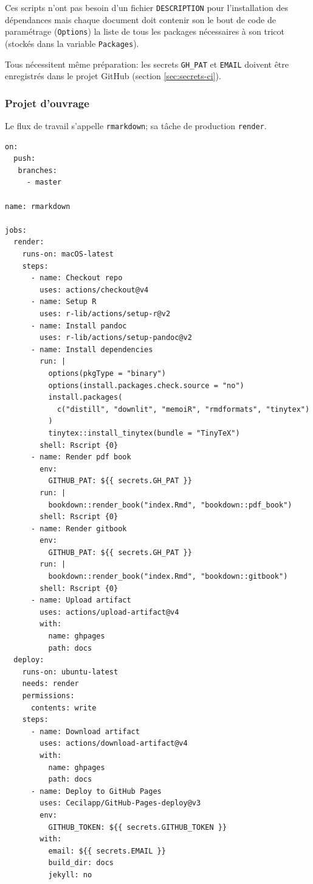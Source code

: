 \documentclass[
  12pt,
  french,
  a4paper,
  extrafontsizes,onecolumn,openright
  ]{memoir}
\begin{document}
Ces scripts n'ont pas besoin d'un fichier \texttt{DESCRIPTION} pour l'installation des dépendances mais chaque document doit contenir son le bout de code de paramétrage (\texttt{Options}) la liste de tous les packages nécessaires à son tricot (stockés dans la variable \texttt{Packages}).

Tous nécessitent même préparation: les secrets \texttt{GH\_PAT} et \texttt{EMAIL} doivent être enregistrés dans le projet GitHub (section \ref{sec:secrets-ci}).

\subsubsection{Projet d'ouvrage}\label{sec:bookdown-ci}

Le flux de travail s'appelle \texttt{rmarkdown}; sa tâche de production \texttt{render}.

\begin{verbatim}
on:
  push:
   branches:
     - master

name: rmarkdown

jobs:
  render:
    runs-on: macOS-latest
    steps:
      - name: Checkout repo
        uses: actions/checkout@v4
      - name: Setup R
        uses: r-lib/actions/setup-r@v2
      - name: Install pandoc
        uses: r-lib/actions/setup-pandoc@v2
      - name: Install dependencies
        run: |
          options(pkgType = "binary")
          options(install.packages.check.source = "no")
          install.packages(
            c("distill", "downlit", "memoiR", "rmdformats", "tinytex")
          )
          tinytex::install_tinytex(bundle = "TinyTeX")
        shell: Rscript {0}
      - name: Render pdf book
        env:
          GITHUB_PAT: ${{ secrets.GH_PAT }}
        run: |
          bookdown::render_book("index.Rmd", "bookdown::pdf_book")
        shell: Rscript {0}
      - name: Render gitbook
        env:
          GITHUB_PAT: ${{ secrets.GH_PAT }}
        run: |
          bookdown::render_book("index.Rmd", "bookdown::gitbook")
        shell: Rscript {0}
      - name: Upload artifact
        uses: actions/upload-artifact@v4
        with:
          name: ghpages
          path: docs
  deploy:
    runs-on: ubuntu-latest
    needs: render
    permissions:
      contents: write
    steps:
      - name: Download artifact
        uses: actions/download-artifact@v4
        with:
          name: ghpages
          path: docs
      - name: Deploy to GitHub Pages
        uses: Cecilapp/GitHub-Pages-deploy@v3
        env:
          GITHUB_TOKEN: ${{ secrets.GITHUB_TOKEN }}
        with:
          email: ${{ secrets.EMAIL }}
          build_dir: docs
          jekyll: no
\end{verbatim}
\end{document}
